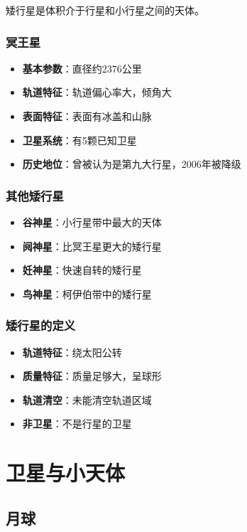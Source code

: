 \documentclass[12pt,UTF8]{ctexbook}
\begin{document}
矮行星是体积介于行星和小行星之间的天体。

\subsection{冥王星}

\begin{itemize}
  \item \textbf{基本参数}：直径约2376公里
  \item \textbf{轨道特征}：轨道偏心率大，倾角大
  \item \textbf{表面特征}：表面有冰盖和山脉
  \item \textbf{卫星系统}：有5颗已知卫星
  \item \textbf{历史地位}：曾被认为是第九大行星，2006年被降级
\end{itemize}

\subsection{其他矮行星}

\begin{itemize}
  \item \textbf{谷神星}：小行星带中最大的天体
  \item \textbf{阋神星}：比冥王星更大的矮行星
  \item \textbf{妊神星}：快速自转的矮行星
  \item \textbf{鸟神星}：柯伊伯带中的矮行星
\end{itemize}

\subsection{矮行星的定义}

\begin{itemize}
  \item \textbf{轨道特征}：绕太阳公转
  \item \textbf{质量特征}：质量足够大，呈球形
  \item \textbf{轨道清空}：未能清空轨道区域
  \item \textbf{非卫星}：不是行星的卫星
\end{itemize}

\chapter{卫星与小天体}
\section{月球}
\end{document}
